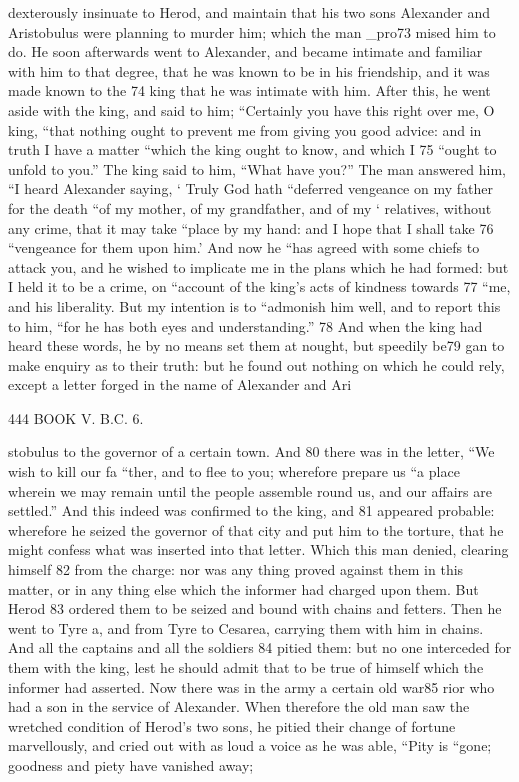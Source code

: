 dexterously insinuate to Herod, and maintain that his two sons Alexander and Aristobulus were planning to murder him; which the man _pro73 mised him to do. He soon afterwards went to Alexander, and became intimate and familiar with him to that degree, that he was known to be in his friendship, and it was made known to the 74 king that he was intimate with him. After this, he went aside with the king, and said to him; “Certainly you have this right over me, O king, “that nothing ought to prevent me from giving you good advice: and in truth I have a matter “which the king ought to know, and which I 75 “ought to unfold to you.” The king said to him, “What have you?” The man answered him, “I heard Alexander saying, ‘ Truly God hath “deferred vengeance on my father for the death “of my mother, of my grandfather, and of my ‘ relatives, without any crime, that it may take “place by my hand: and I hope that I shall take 76 “vengeance for them upon him.’ And now he “has agreed with some chiefs to attack you, and he wished to implicate me in the plans which he had formed: but I held it to be a crime, on “account of the king’s acts of kindness towards 77 “me, and his liberality. But my intention is to “admonish him well, and to report this to him, “for he has both eyes and understanding.” 78 And when the king had heard these words, he by no means set them at nought, but speedily be79 gan to make enquiry as to their truth: but he found out nothing on which he could rely, except a letter forged in the name of Alexander and Ari

444 BOOK V. B.C. 6. 

stobulus to the governor of a certain town. And 80 there was in the letter, “We wish to kill our fa
“ther, and to flee to you; wherefore prepare us “a place wherein we may remain until the people 
 assemble round us, and our affairs are settled.” And this indeed was confirmed to the king, and 81 appeared probable: wherefore he seized the governor of that city and put him to the torture, that he might confess what was inserted into that letter. Which this man denied, clearing himself 82 from the charge: nor was any thing proved against them in this matter, or in any thing else which the informer had charged upon them. But Herod 83 ordered them to be seized and bound with chains and fetters. Then he went to Tyre a, and from Tyre to Cesarea, carrying them with him in chains. And all the captains and all the soldiers 84 pitied them: but no one interceded for them with the king, lest he should admit that to be true of himself which the informer had asserted. 
Now there was in the army a certain old war85 rior who had a son in the service of Alexander. When therefore the old man saw the wretched condition of Herod’s two sons, he pitied their change of fortune marvellously, and cried out with as loud a voice as he was able, “Pity is “gone; goodness and piety have vanished away; 

